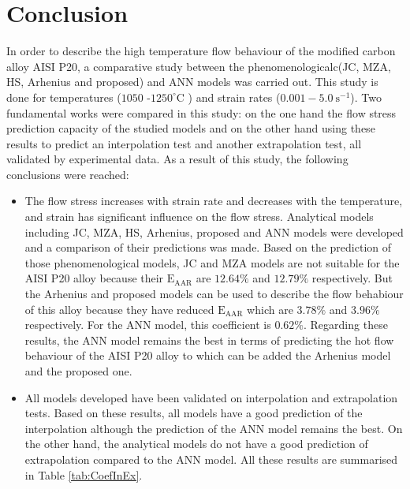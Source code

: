 \documentclass[twoside,english,1p,final,sort&compress]{elsarticle}
\theoremstyle{plain}
\newcommand{\AARE}{\text{E}_\text{AAR}}
\begin{document}
\section{Conclusion \label{sec:Conclusion}}
In order to describe the high temperature flow behaviour of the modified carbon alloy AISI P20, a comparative study between the phenomenologicalc(JC, MZA, HS, Arhenius and proposed) and ANN models was carried out. This study is done for temperatures ($1050$ -$1250^\circ$C ) and strain rates ($0.001 - 5.0\ \text{s}^{-1}$). Two fundamental works were compared in this study: on the one hand the flow stress prediction capacity of the studied models and on the other hand using these results to predict an interpolation test and another extrapolation test, all validated by experimental data. As a result of this study, the following conclusions were reached:
\begin{itemize}
\item The ﬂow stress increases with strain rate and decreases with the temperature, and strain has signiﬁcant inﬂuence on the ﬂow stress. Analytical models including JC, MZA, HS, Arhenius, proposed and ANN models were developed and a comparison of their predictions was made. Based on the prediction of those phenomenological models, JC and MZA models are not suitable for the AISI P20 alloy because their $\AARE$ are $12.64\%$ and $12.79\%$ respectively. But the Arhenius and proposed models can be used to describe the flow behabiour of this alloy because they have reduced $\AARE$ which are $3.78\%$ and $3.96\%$ respectively. For the ANN model, this coefficient is $0.62\%$. Regarding these results, the ANN model remains the best in terms of predicting the hot flow behaviour of the AISI P20 alloy to which can be added the Arhenius model and the proposed one.
\item All models developed have been validated on interpolation and extrapolation tests. Based on these results, all models have a good prediction of the interpolation although the prediction of the ANN model remains the best. On the other hand, the analytical models do not have a good prediction of extrapolation compared to the ANN model. All these results are summarised in Table \ref{tab:CoefInEx}. 
\end{itemize}



\end{document}
